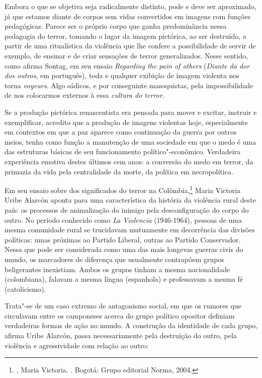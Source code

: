 Embora o que se objetiva seja radicalmente distinto, pode e deve ser
aproximado, já que estamos diante de corpos sem vidas convertidos em
imagens com funções pedagógicas. Parece ser o próprio corpo que ganha
predominância nessa pedagogia do terror, tomando o lugar da imagem
pictórica, ao ser destruído, a partir de uma ritualística da violência
que lhe confere a possibilidade de servir de exemplo, de ensinar e de
criar sensações de terror generalizados. Nesse sentido, como afirma
Sontag, em seu ensaio \emph{Regarding the pain of others} (\emph{Diante da dor dos outros}, em português), toda e qualquer exibição de imagem violenta nos torna \emph{voyeurs}.
Algo sádicos, e por conseguinte masoquistas, pela impossibilidade de nos
colocarmos externos à essa \emph{cultura do terror}.

Se a produção pictórica renascentista era pensada para mover e excitar,
instruir e exemplificar, acredito que a produção de imagens violentas
hoje, especialmente em contextos em que a paz aparece como continuação
da guerra por outros meios, tenha como função a
manutenção de uma sociedade em que o medo é uma das estruturas básicas
de seu funcionamento político"-econômico. Verdadeira experiência emotiva
destes últimos cem anos: a conversão do medo em terror, da primazia da
vida pela centralidade da morte, da política em necropolítica.

\asterisc

Em seu ensaio sobre dos significados do terror na Colômbia,\footnote{, Maria Victoria. {}. Bogotá: Grupo
  editorial Norma, 2004.} Maria Victoria Uribe Alarcón aponta
para uma característica da história da violência rural deste país: os
processos de animalização do inimigo pela desconfiguração do corpo do outro. No
período conhecido como \emph{La Violencia} (1946-1964), pessoas de uma
mesma comunidade rural se trucidavam mutuamente em decorrência das
divisões políticas: umas próximas ao Partido Liberal, outras ao Partido
Conservador. Nessa que pode ser considerada como uma das mais longevas
guerras civis do mundo, os marcadores de diferença que usualmente
contrapõem grupos beligerantes inexistiam. Ambos os grupos tinham a
mesma nacionalidade (colombiana), falavam a mesma língua (espanhola) e
professavam a mesma fé (catolicismo).

Trata"-se de um caso extremo de antagonismo social, em que os rumores que
circulavam entre os camponeses acerca do grupo político opositor definiam verdadeiras formas de ação no mundo. A construção da identidade
de cada grupo, afirma Uribe Alarcón, passa necessariamente pela
destruição do outro, pela violência e agressividade com relação ao
outro:

